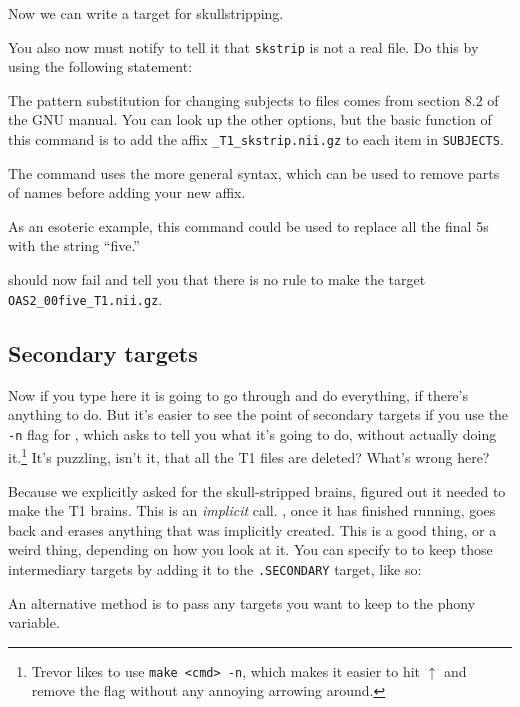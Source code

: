 Now we can write a target for skullstripping.

You also now must notify \maken{} to tell it that \texttt{skstrip} is not a real  file. Do this by using the following statement:

The pattern substitution for changing subjects to files comes from section 8.2 of the GNU \maken{} manual. You can look up the other options, but the basic function of this command is to add the affix \texttt{_T1_skstrip.nii.gz} to each item in \texttt{SUBJECTS}. 

The command uses the more general syntax, which can be used to remove parts of names before adding your new affix.

As an esoteric example, this command could be used to replace all the final 5s with the string ``five.''

\maken{} should now fail and tell you that there is no rule to make the target \texttt{OAS2_00five_T1.nii.gz}.

\subsection{Secondary targets}

Now if you type \maken{} here it is going to go through and do everything, if there's anything to do. But it's easier to see the point of secondary targets if you use the \texttt{-n} flag for \maken{}, which asks \maken{} to tell you what it's going to do, without actually doing it.\footnote{Trevor likes to use \texttt{make <cmd> -n}, which makes it easier to hit $\uparrow$ and remove the flag without any annoying arrowing around.} It's puzzling, isn't it, that all the T1 files are deleted? What's wrong here?

Because we explicitly asked for the skull-stripped brains, \maken{} figured out it needed to make the T1 brains. This is an \emph{implicit} call. \maken, once it has finished running, goes back and erases anything that was implicitly created. This is a good thing, or a weird thing, depending on how you look at it. You can specify to \maken{} to keep those intermediary targets by adding it to the \texttt{.SECONDARY} target, like so:

An alternative method is to pass any targets you want to keep to the phony variable.

